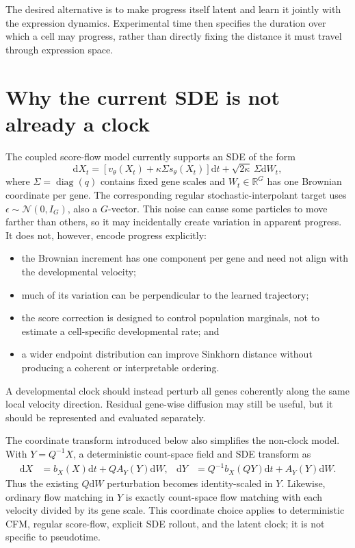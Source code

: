 \documentclass[11pt]{article}
\newcommand{\R}{\mathbb{R}}
\newcommand{\N}{\mathcal{N}}
\newcommand{\dd}{\mathrm{d}}
\begin{document}
The desired alternative is to make progress itself latent and learn it jointly
with the expression dynamics. Experimental time then specifies the duration
over which a cell may progress, rather than directly fixing the distance it
must travel through expression space.

\section{Why the current SDE is not already a clock}

The coupled score-flow model currently supports an SDE of the form
\begin{equation}
  \dd X_t
  = \left[v_\theta(X_t)+\kappa\Sigma s_\theta(X_t)\right]\dd t
  + \sqrt{2\kappa}\,\Sigma\dd W_t,
  \label{eq:current-sde}
\end{equation}
where $\Sigma=\operatorname{diag}(q)$ contains fixed gene scales and
$W_t\in\R^G$ has one Brownian coordinate per gene. The corresponding regular
stochastic-interpolant target uses
$\epsilon\sim\N(0,I_G)$, also a $G$-vector. This noise can cause some particles
to move farther than others, so it may incidentally create variation in
apparent progress. It does not, however, encode progress explicitly:
\begin{itemize}
  \item the Brownian increment has one component per gene and need not align
        with the developmental velocity;
  \item much of its variation can be perpendicular to the learned trajectory;
  \item the score correction is designed to control population marginals, not
        to estimate a cell-specific developmental rate; and
  \item a wider endpoint distribution can improve Sinkhorn distance without
        producing a coherent or interpretable ordering.
\end{itemize}

A developmental clock should instead perturb all genes coherently along the
same local velocity direction. Residual gene-wise diffusion may still be
useful, but it should be represented and evaluated separately.

The coordinate transform introduced below also simplifies the non-clock model.
With $Y=Q^{-1}X$, a deterministic count-space field and SDE transform as
\begin{align}
  \dd X&=b_X(X)\dd t+QA_Y(Y)\dd W,
  &
  \dd Y&=Q^{-1}b_X(QY)\dd t+A_Y(Y)\dd W.
  \label{eq:general-coordinate-sde}
\end{align}
Thus the existing $Q\dd W$ perturbation becomes identity-scaled in $Y$.
Likewise, ordinary flow matching in $Y$ is exactly count-space flow matching
with each velocity divided by its gene scale. This coordinate choice applies
to deterministic CFM, regular score-flow, explicit SDE rollout, and the latent
clock; it is not specific to pseudotime.
\end{document}
